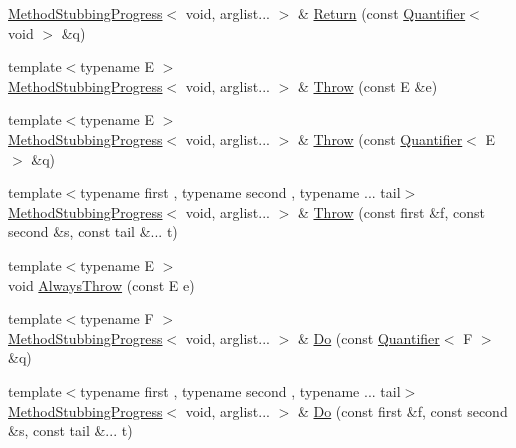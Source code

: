 \begin{DoxyCompactItemize}
\item 
\mbox{\hyperlink{structfakeit_1_1MethodStubbingProgress}{Method\+Stubbing\+Progress}}$<$ void, arglist... $>$ \& \mbox{\hyperlink{structfakeit_1_1MethodStubbingProgress_3_01void_00_01arglist_8_8_8_01_4_afbc0d4429dddcbab63de1c88176ea0f1}{Return}} (const \mbox{\hyperlink{structfakeit_1_1Quantifier}{Quantifier}}$<$ void $>$ \&q)
\item 
{\footnotesize template$<$typename E $>$ }\\\mbox{\hyperlink{structfakeit_1_1MethodStubbingProgress}{Method\+Stubbing\+Progress}}$<$ void, arglist... $>$ \& \mbox{\hyperlink{structfakeit_1_1MethodStubbingProgress_3_01void_00_01arglist_8_8_8_01_4_a8b0d920dc6424eadd7dce7cb9df66814}{Throw}} (const E \&e)
\item 
{\footnotesize template$<$typename E $>$ }\\\mbox{\hyperlink{structfakeit_1_1MethodStubbingProgress}{Method\+Stubbing\+Progress}}$<$ void, arglist... $>$ \& \mbox{\hyperlink{structfakeit_1_1MethodStubbingProgress_3_01void_00_01arglist_8_8_8_01_4_a9eb6f25dd382ef939b775345205f42c1}{Throw}} (const \mbox{\hyperlink{structfakeit_1_1Quantifier}{Quantifier}}$<$ E $>$ \&q)
\item 
{\footnotesize template$<$typename first , typename second , typename ... tail$>$ }\\\mbox{\hyperlink{structfakeit_1_1MethodStubbingProgress}{Method\+Stubbing\+Progress}}$<$ void, arglist... $>$ \& \mbox{\hyperlink{structfakeit_1_1MethodStubbingProgress_3_01void_00_01arglist_8_8_8_01_4_a2db97b61a39cc6cecc379f6d51234c8a}{Throw}} (const first \&f, const second \&s, const tail \&... t)
\item 
{\footnotesize template$<$typename E $>$ }\\void \mbox{\hyperlink{structfakeit_1_1MethodStubbingProgress_3_01void_00_01arglist_8_8_8_01_4_ad42a19c184f5efba2f997b30f57b9a24}{Always\+Throw}} (const E e)
\item 
{\footnotesize template$<$typename F $>$ }\\\mbox{\hyperlink{structfakeit_1_1MethodStubbingProgress}{Method\+Stubbing\+Progress}}$<$ void, arglist... $>$ \& \mbox{\hyperlink{structfakeit_1_1MethodStubbingProgress_3_01void_00_01arglist_8_8_8_01_4_a3091661d404ffecf2733281471d536c4}{Do}} (const \mbox{\hyperlink{structfakeit_1_1Quantifier}{Quantifier}}$<$ F $>$ \&q)
\item 
{\footnotesize template$<$typename first , typename second , typename ... tail$>$ }\\\mbox{\hyperlink{structfakeit_1_1MethodStubbingProgress}{Method\+Stubbing\+Progress}}$<$ void, arglist... $>$ \& \mbox{\hyperlink{structfakeit_1_1MethodStubbingProgress_3_01void_00_01arglist_8_8_8_01_4_a45b048006587b626f8220aa4b196de2a}{Do}} (const first \&f, const second \&s, const tail \&... t)

\end{DoxyCompactItemize}
